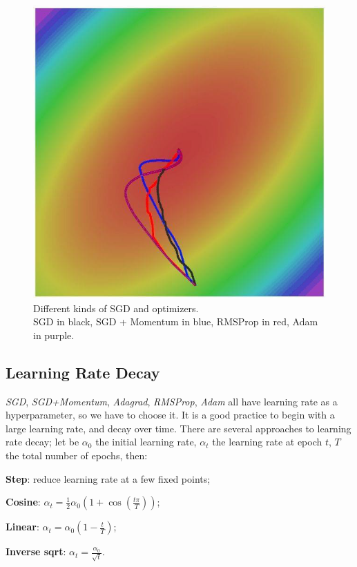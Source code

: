 \begin{minipage}{.5\linewidth}
    \begin{figure}[H]
        \centering
        \includegraphics[width=.9\linewidth]{images/momentum1}
        \caption[Different kinds of SGD and optimizers]{Different kinds of SGD and optimizers.\\
            SGD in black, SGD + Momentum in blue, RMSProp in red, Adam in purple.}
        \label{fig:momentum-2}
    \end{figure}
\end{minipage}


\subsection{Learning Rate Decay}\label{sec:tnn-learning-rate}

\textit{SGD}, \textit{SGD+Momentum}, \textit{Adagrad}, \textit{RMSProp}, \textit{Adam} all have learning rate as a hyperparameter, so we have to choose it. It is a good practice to begin with a large learning rate, and decay over time. There are several approaches to learning rate decay; let be $\alpha_0$ the initial learning rate, $\alpha_t$ the learning rate at epoch $t$, $T$ the total number of epochs, then:
\begin{myitem}
    \item \textbf{Step}: reduce learning rate at a few fixed points;
    \item \textbf{Cosine}: $\alpha_t = \frac12 \alpha_0 (1 + \cos(\frac{t \pi}{T}))$;
    \item \textbf{Linear}: $\alpha_t = \alpha_0 (1 - \frac{t}{T})$;
    \item \textbf{Inverse sqrt}: $\alpha_t = \frac{\alpha_0}{\sqrt{t}}$.
\end{myitem}

